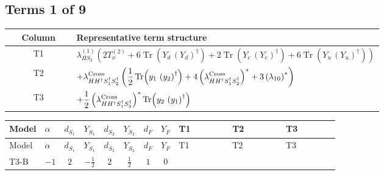 \documentclass[8pt]{article}
\begin{document}
\begin{landscape}
\subsection*{Terms 1 of 9}
\begin{center}
\begin{tabular}{@{}c >{\raggedright\arraybackslash}p{0.82\linewidth}@{}}
\toprule
Column & Representative term structure \\
\midrule
T1 & \(\displaystyle {\lambda_{HS_2}^{(1)}} (2 T_{\nu}^{(2)}+6 \operatorname{Tr}\!\left({Y_d}\,\left({Y_d}\right)^{\dagger}\right)+2 \operatorname{Tr}\!\left({Y_e}\,\left({Y_e}\right)^{\dagger}\right)+6 \operatorname{Tr}\!\left({Y_u}\,\left({Y_u}\right)^{\dagger}\right))\) \\
\midrule
T2 & \(\displaystyle +{\lambda_{H H^\dagger S_1^\dagger S_2^\dagger}^{\rm Cross}} \left(\frac{1}{2} \operatorname{Tr}\!\left({y_1}\,\left({y_2}\right)^{\dagger}\right)+4 \left({\lambda_{H H^\dagger S_1^\dagger S_2^\dagger}^{\rm Cross}}\right)^{*}+3 \left({\lambda_{10}}\right)^{*}\right)\) \\
\midrule
T3 & \(\displaystyle +\frac{1}{2} \left({\lambda_{H H^\dagger S_1^\dagger S_2^\dagger}^{\rm Cross}}\right)^{*} \operatorname{Tr}\!\left({y_2}\,\left({y_1}\right)^{\dagger}\right)\) \\
\midrule
\bottomrule
\end{tabular}
\end{center}
\smallskip
\tiny
\begin{longtable}{@{}llcccccc >{\raggedright\arraybackslash}p{0.21\linewidth} >{\raggedright\arraybackslash}p{0.21\linewidth} >{\raggedright\arraybackslash}p{0.21\linewidth}@{}}
\toprule
Model & $\alpha$ & $d_{S_1}$ & $Y_{S_1}$ & $d_{S_2}$ & $Y_{S_2}$ & $d_F$ & $Y_F$ & T1 & T2 & T3 \\
\midrule
\endfirsthead
\toprule
Model & $\alpha$ & $d_{S_1}$ & $Y_{S_1}$ & $d_{S_2}$ & $Y_{S_2}$ & $d_F$ & $Y_F$ & T1 & T2 & T3 \\
\midrule
\endhead
T3-B & $-1$ & $2$ & $-\frac{1}{2}$ & $2$ & $\frac{1}{2}$ & $1$ & $0$ & \scriptsize\adjustbox{max width=\linewidth}{$\begin{gathered} {\lambda_{HS_2}^{(1)}} (2 T_{\nu}^{(2)}+6 \operatorname{Tr}\!\left({Y_d}\,\left({Y_d}\right)^{\dagger}\right)+2 \operatorname{Tr}\!\left({Y_e}\,\left({Y_e}\right)^{\dagger}\right)+6 \operatorname{Tr}\!\left({Y_u}\,\left({Y_u}\right)^{\dagger}\right))\end{gathered}$} & \scriptsize\adjustbox{max width=\linewidth}{$\begin{gathered} +{\lambda_{H H^\dagger S_1^\dagger S_2^\dagger}^{\rm Cross}} \left(\frac{1}{2} \operatorname{Tr}\!\left({y_1}\,\left({y_2}\right)^{\dagger}\right)+4 \left({\lambda_{H H^\dagger S_1^\dagger S_2^\dagger}^{\rm Cross}}\right)^{*}+3 \left({\lambda_{10}}\right)^{*}\right)\end{gathered}$} & \scriptsize\adjustbox{max width=\linewidth}{$\begin{gathered} +\frac{1}{2} \left({\lambda_{H H^\dagger S_1^\dagger S_2^\dagger}^{\rm Cross}}\right)^{*} \operatorname{Tr}\!\left({y_2}\,\left({y_1}\right)^{\dagger}\right)\end{gathered}$} \\

\end{longtable}
\end{landscape}
\end{document}
